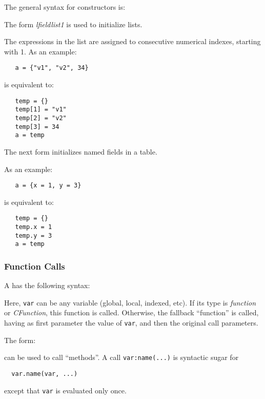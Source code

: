 The general syntax for constructors is:
\begin{Produc}
\end{Produc}

The form {\em lfieldlist1} is used to initialize lists.
\begin{Produc}
\end{Produc}%
The expressions in the list are assigned to consecutive numerical indexes,
starting with 1.
As an example:
\begin{verbatim}
   a = {"v1", "v2", 34}
\end{verbatim}
is equivalent to:
\begin{verbatim}
   temp = {}
   temp[1] = "v1"
   temp[2] = "v2"
   temp[3] = 34
   a = temp
\end{verbatim}

The next form initializes named fields in a table.
\begin{Produc}
\end{Produc}%
As an example:
\begin{verbatim}
   a = {x = 1, y = 3}
\end{verbatim}
is equivalent to:
\begin{verbatim}
   temp = {}
   temp.x = 1
   temp.y = 3
   a = temp
\end{verbatim}


\subsubsection{Function Calls}  \label{functioncall}
A  has the following syntax:
\begin{Produc}
\end{Produc}%
Here, \verb'var' can be any variable (global, local, indexed, etc).
If its type is {\em function\/} or {\em CFunction\/},
this function is called.
Otherwise, the fallback ``function'' is called,
having as first parameter the value of \verb'var',
and then the original call parameters.

The form:
\begin{Produc}
\end{Produc}%
can be used to call ``methods''.
A call \verb'var:name(...)'
is syntactic sugar for
\begin{verbatim}
  var.name(var, ...)
\end{verbatim}
except that \verb'var' is evaluated only once.

